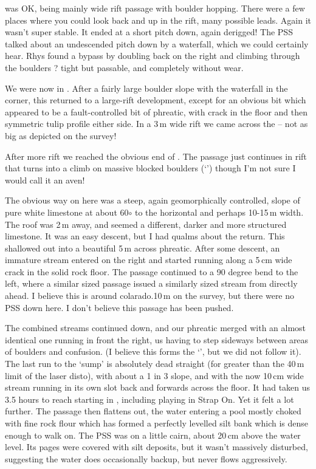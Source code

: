  was OK, being mainly wide rift passage with boulder hopping. There were a few places where you could look back and up in the rift, many possible leads. Again it wasn't super stable. It ended at a short pitch down, again derigged! The PSS talked about an undescended pitch down by a waterfall, which we could certainly hear.
Rhys found a bypass by doubling back on the right and climbing through the boulders ? tight but passable, and completely without wear.

We were now in . After a fairly large boulder slope with the waterfall in the corner, this returned to a large-rift development, except for an obvious bit which appeared to be a fault-controlled bit of phreatic, with crack in the floor and then symmetric tulip profile either side. In a 3\,m wide rift we came across the  -- not as big as depicted on the survey!

After more rift we reached the obvious end of . The passage just continues in rift that turns into a climb on massive blocked boulders (`') though I'm not sure I would call it an aven!

The obvious way on here was a steep, again geomorphically controlled, slope of pure white limestone at about 60$\circ$ to the horizontal and perhaps 10-15\,m width. The roof was 2\,m away, and seemed a different, darker and more structured limestone. It was an easy descent, but I had qualms about the return.
This shallowed out into a beautiful 5\,m across phreatic. After some descent, an immature stream entered on the right and started running along a 5\,cm wide crack in the solid rock floor. The passage continued to a 90 degree bend to the left, where a similar sized passage issued a similarly sized stream from directly ahead. I believe this is around colarado.10\,m on the survey, but there were no PSS down here. I don't believe this passage has been pushed.

The combined streams continued down, and our phreatic merged with an almost identical one running in front the right, us having to step sideways between areas of boulders and confusion. (I believe this forms the `', but we did not follow it).
The last run to the `sump' is absolutely dead straight (for greater than the 40\,m limit of the laser disto), with about a 1 in 3 slope, and with the now 10\,cm wide stream running in its own slot back and forwards across the floor. It had taken us 3.5 hours to reach  starting in , including playing in Strap On. Yet it felt a lot further.
The passage then flattens out, the water entering a pool mostly choked with fine rock flour which has formed a perfectly levelled silt bank which is dense enough to walk on. The PSS was on a little cairn, about 20\,cm above the water level. Its pages were covered with silt deposits, but it wasn't massively disturbed, suggesting the water does occasionally backup, but never flows aggressively.

